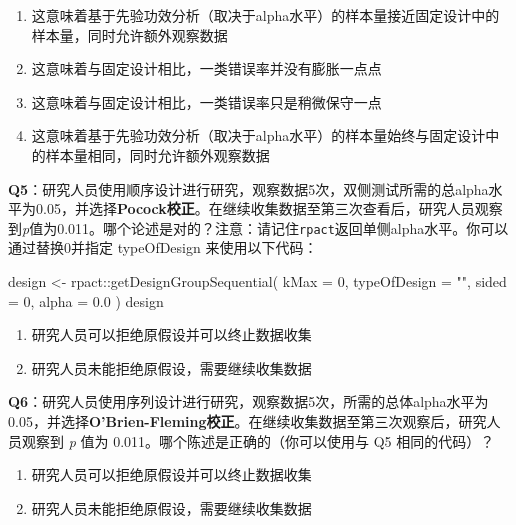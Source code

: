 \documentclass[
  letterpaper,
  DIV=11,
  numbers=noendperiod]{scrreprt}
\newenvironment{Shaded}{\begin{snugshade}}{\end{snugshade}}
\newcommand{\AttributeTok}[1]{\textcolor[rgb]{0.40,0.45,0.13}{#1}}
\newcommand{\DecValTok}[1]{\textcolor[rgb]{0.68,0.00,0.00}{#1}}
\newcommand{\FloatTok}[1]{\textcolor[rgb]{0.68,0.00,0.00}{#1}}
\newcommand{\FunctionTok}[1]{\textcolor[rgb]{0.28,0.35,0.67}{#1}}
\newcommand{\NormalTok}[1]{\textcolor[rgb]{0.00,0.23,0.31}{#1}}
\newcommand{\OtherTok}[1]{\textcolor[rgb]{0.00,0.23,0.31}{#1}}
\newcommand{\SpecialCharTok}[1]{\textcolor[rgb]{0.37,0.37,0.37}{#1}}
\newcommand{\StringTok}[1]{\textcolor[rgb]{0.13,0.47,0.30}{#1}}
\providecommand{\tightlist}{%
  \setlength{\itemsep}{0pt}\setlength{\parskip}{0pt}}\usepackage{longtable,booktabs,array}
\begin{document}
\begin{enumerate}
\def\labelenumi{\Alph{enumi})}
\tightlist
\item
  这意味着基于先验功效分析（取决于alpha水平）的样本量接近固定设计中的样本量，同时允许额外观察数据
\item
  这意味着与固定设计相比，一类错误率并没有膨胀一点点
\item
  这意味着与固定设计相比，一类错误率只是稍微保守一点
\item
  这意味着基于先验功效分析（取决于alpha水平）的样本量始终与固定设计中的样本量相同，同时允许额外观察数据
\end{enumerate}

\textbf{Q5}：研究人员使用顺序设计进行研究，观察数据5次，双侧测试所需的总alpha水平为0.05，并选择\textbf{Pocock校正}。在继续收集数据至第三次查看后，研究人员观察到\emph{p}值为0.011。哪个论述是对的？注意：请记住\texttt{rpact}返回单侧alpha水平。你可以通过替换0并指定
typeOfDesign 来使用以下代码：

\begin{Shaded}
\begin{Highlighting}[]
\NormalTok{design }\OtherTok{\textless{}{-}}\NormalTok{ rpact}\SpecialCharTok{::}\FunctionTok{getDesignGroupSequential}\NormalTok{(}
  \AttributeTok{kMax =} \DecValTok{0}\NormalTok{,}
  \AttributeTok{typeOfDesign =} \StringTok{""}\NormalTok{,}
  \AttributeTok{sided =} \DecValTok{0}\NormalTok{,}
  \AttributeTok{alpha =} \FloatTok{0.0}
\NormalTok{)}
\NormalTok{design}
\end{Highlighting}
\end{Shaded}

\begin{enumerate}
\def\labelenumi{\Alph{enumi})}
\tightlist
\item
  研究人员可以拒绝原假设并可以终止数据收集
\item
  研究人员未能拒绝原假设，需要继续收集数据
\end{enumerate}

\textbf{Q6}：研究人员使用序列设计进行研究，观察数据5次，所需的总体alpha水平为0.05，并选择\textbf{O'Brien-Fleming校正}。在继续收集数据至第三次观察后，研究人员观察到
\emph{p} 值为 0.011。哪个陈述是正确的（你可以使用与 Q5 相同的代码）？

\begin{enumerate}
\def\labelenumi{\Alph{enumi})}
\tightlist
\item
  研究人员可以拒绝原假设并可以终止数据收集
\item
  研究人员未能拒绝原假设，需要继续收集数据
\end{enumerate}
\end{document}

